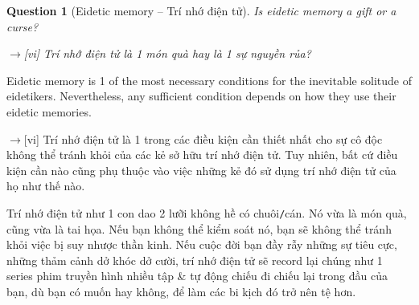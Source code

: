 \documentclass[12pt,oneside]{book}
\newtheorem{question}{Question}
\begin{document}
\begin{question}[Eidetic memory -- Trí nhớ điện tử]
	Is eidetic memory a gift or a curse?
	
	{\sf[en]$\to$[vi]} Trí nhớ điện tử là 1 món quà hay là 1 sự nguyền rủa?
\end{question}
Eidetic memory is 1 of the most necessary conditions for the inevitable solitude of eidetikers. Nevertheless, any sufficient condition depends on how they use their eidetic memories.

{\sf[en]$\to$[vi]} Trí nhớ điện tử là 1 trong các điều kiện cần thiết nhất cho sự cô độc không thể tránh khỏi của các kẻ sở hữu trí nhớ điện tử. Tuy nhiên, bất cứ điều kiện cần nào cũng phụ thuộc vào việc những kẻ đó sử dụng trí nhớ điện tử của họ như thế nào.

Trí nhớ điện tử như 1 con dao 2 lưỡi không hề có chuôi{\tt/}cán. Nó vừa là món quà, cũng vừa là tai họa. Nếu bạn không thể kiểm soát nó, bạn sẽ không thể tránh khỏi việc bị suy nhược thần kinh. Nếu cuộc đời bạn đầy rẫy những sự tiêu cực, những thảm cảnh dở khóc dở cười, trí nhớ điện tử sẽ record lại chúng như 1 series phim truyền hình nhiều tập \& tự động chiếu đi chiếu lại trong đầu của bạn, dù bạn có muốn hay không, để làm các bi kịch đó trở nên tệ hơn.
\end{document}
